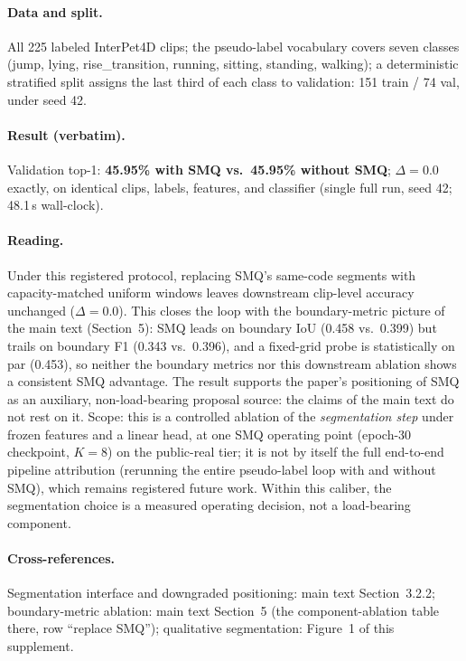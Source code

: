 \documentclass[11pt,a4paper]{article}
\begin{document}
\paragraph{Data and split.}
All 225 labeled InterPet4D clips; the pseudo-label vocabulary covers seven classes (jump, lying, rise\_transition, running, sitting, standing, walking); a deterministic stratified split assigns the last third of each class to validation: 151 train / 74 val, under seed 42.

\paragraph{Result (verbatim).}
Validation top-1: \textbf{45.95\% with SMQ vs.\ 45.95\% without SMQ}; $\Delta = 0.0$ exactly, on identical clips, labels, features, and classifier (single full run, seed 42; 48.1\,s wall-clock).

\paragraph{Reading.}
Under this registered protocol, replacing SMQ's same-code segments with capacity-matched uniform windows leaves downstream clip-level accuracy unchanged ($\Delta = 0.0$). This closes the loop with the boundary-metric picture of the main text (Section~5): SMQ leads on boundary IoU (0.458 vs.\ 0.399) but trails on boundary F1 (0.343 vs.\ 0.396), and a fixed-grid probe is statistically on par (0.453), so neither the boundary metrics nor this downstream ablation shows a consistent SMQ advantage. The result supports the paper's positioning of SMQ as an auxiliary, non-load-bearing proposal source: the claims of the main text do not rest on it. Scope: this is a controlled ablation of the \emph{segmentation step} under frozen features and a linear head, at one SMQ operating point (epoch-30 checkpoint, $K{=}8$) on the public-real tier; it is not by itself the full end-to-end pipeline attribution (rerunning the entire pseudo-label loop with and without SMQ), which remains registered future work. Within this caliber, the segmentation choice is a measured operating decision, not a load-bearing component.

\paragraph{Cross-references.}
Segmentation interface and downgraded positioning: main text Section~3.2.2; boundary-metric ablation: main text Section~5 (the component-ablation table there, row ``replace SMQ''); qualitative segmentation: Figure~1 of this supplement.
\end{document}
